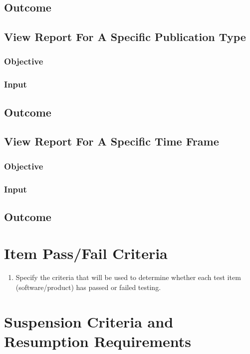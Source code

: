 \subsection{Outcome}

\subsection{View Report For A Specific Publication Type}
\subsubsection{Objective}
\subsubsection{Input}
\subsection{Outcome}

\subsection{View Report For A Specific Time Frame}
\subsubsection{Objective}
\subsubsection{Input}
\subsection{Outcome}

\section{Item Pass/Fail Criteria}
   
\begin{enumerate}
	\item Specify the criteria that will be used to determine whether each test item (software/product) has passed or failed testing.
\end{enumerate}

\section{Suspension Criteria and Resumption Requirements}

